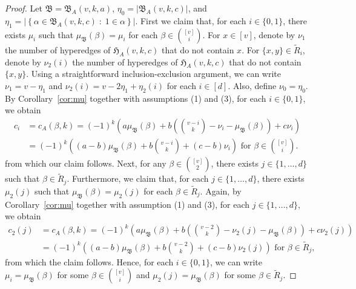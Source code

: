\documentclass[11pt]{article}
\begin{document}
\begin{proof}
Let $\mathfrak B = \mathfrak B_A(v,k,a)$, $\eta_{0} = |\mathfrak B_A(v,k,c)|$, and $\eta_1 = \left |\left \{ \alpha \in \mathfrak B_A(v,k,c) \; : \; 1 \in \alpha \right \} \right |$.
First we claim that, for each $i\in\{0,1\}$, there exists $\mu_i$ such that $\mu_\mathfrak B(\beta) = \mu_i$ for each $\beta \in \binom{[v]}{i}$. 
For $x \in [v]$, denote by $\nu_1$ the number of hyperedges of $\mathfrak H_{A}(v,k,c)$ that do not contain $x$.
For $\{x,y\}\in \tilde{R}_i$, denote by $\nu_2(i)$ the number of hyperedges of $\mathfrak H_{A}(v,k,c)$ that do not contain $\{x,y\}$.
Using a straightforward inclusion-exclusion argument, we can write $\nu_1 = v - \eta_1$ and $\nu_2(i) = v - 2\eta_1+\eta_2(i)$ for each $i \in [d]$.
Also, define $\nu_0 = \eta_0$.
By Corollary~\ref{cor:mu}
together with assumptions (1) and (3), for each $i\in\{0,1\}$, we obtain
\begin{align*}
    c_i &= c_A(\beta,k)=(-1)^{k}\left(a\mu_\mathfrak B(\beta)+b\left(\binom{v-i}{k}-\nu_i-\mu_\mathfrak B(\beta)\right)+c\nu_i\right)\nonumber\\
    &= (-1)^{k}\left((a-b)\mu_\mathfrak B(\beta)+b\binom{v-i}{k}+(c-b)\nu_i\right)\text{ for }\beta\in\binom{[v]}{i}.
\end{align*}
from which our claim follows.
Next, for any $\beta \in \binom{[v]}{2}$, there exists $j \in \{1,\dots,d\}$ such that $\beta \in \tilde{R}_j$.
Furthermore, we claim that, for each $j \in \{1,\dots,d\}$, there exists $\mu_2(j)$ such that $\mu_\mathfrak B(\beta) =\mu_2(j)$ for each $\beta \in \tilde{R}_j$.
Again, by Corollary~\ref{cor:mu}
together with assumption (1) and (3), for each $j \in \{1,\dots,d\}$, we obtain
\begin{align*}
    c_2(j) &=  c_A(\beta,k)=(-1)^{k}\left(a\mu_\mathfrak B(\beta)+b\left(\binom{v-2}{k}-\nu_2(j)-\mu_\mathfrak B(\beta)\right)+c\nu_2(j)\right)\nonumber    \\
    &= (-1)^{k}\left((a-b)\mu_\mathfrak B(\beta)+b\binom{v-2}{k}+(c-b)\nu_2(j)\right)\text{ for }\beta\in\tilde{R}_j,
\end{align*}
from which the claim follows.
Hence, for each $i\in\{0,1\}$, we can write $\mu_i=\mu_\mathfrak B(\beta)$ for some $\beta \in \binom{[v]}{i}$ and $\mu_{2}(j)=\mu_\mathfrak B(\beta)$ for some $\beta \in \tilde{R}_j$.


\end{proof}
\end{document}
